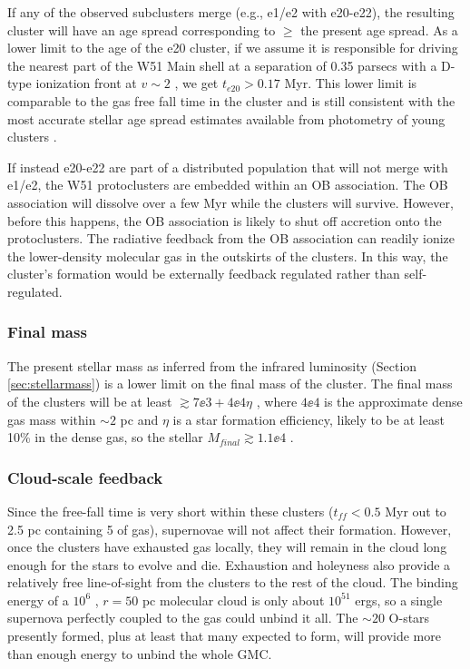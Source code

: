 If any of the observed subclusters merge (e.g., e1/e2 with e20-e22), the
resulting cluster will have an age spread corresponding to $\geq$ the present
age spread.  As a lower limit to the age of the e20 cluster, if we assume it is
responsible for driving the nearest part of the W51 Main shell at a separation
of 0.35 parsecs with a D-type ionization front at $v\sim2$ \kms, we get
$t_{e20} > 0.17$ Myr.  This lower limit is comparable to the gas free fall
time in the cluster and is still consistent with the most accurate stellar age
spread estimates available from photometry of young clusters
\citep[e.g.,][]{Kudryavtseva2012a}.

If instead e20-e22 are part of a distributed population that will not merge
with e1/e2, the W51 protoclusters are embedded within an OB association.  The
OB association will dissolve over a few Myr while the clusters will survive.
However, before this happens, the OB association is likely to shut off
accretion onto the protoclusters.  The radiative feedback from the OB
association can readily ionize the lower-density molecular gas in the outskirts
of the clusters.  In this way, the cluster's formation would be externally
feedback regulated rather than self-regulated.



\subsubsection{Final mass}
The present stellar mass as inferred from the infrared luminosity (Section
\ref{sec:stellarmass}) is a lower limit on the final mass of the cluster.  The
final mass of the clusters will be at least $\gtrsim7\ee{3} + 4\ee{4} \eta$ \msun,
where $4\ee{4}$ \msun is the approximate dense gas mass within $\sim2$ pc and
$\eta$ is a star formation efficiency, likely to be at least 10\% in the dense
gas, so the stellar $M_{final} \gtrsim 1.1\ee{4}$ \msun.

\subsubsection{Cloud-scale feedback}
Since the free-fall time is very short within these clusters ($t_{ff} < 0.5$
Myr out to 2.5 pc containing 5 \msun of gas), supernovae will not affect
their formation.  However, once the clusters have exhausted gas locally, they
will remain in the cloud long enough for the stars to evolve and die.
Exhaustion and holeyness also provide a relatively free line-of-sight from the
clusters to the rest
of the cloud.  The binding energy of a $10^6$ \msun, $r=50$ pc 
molecular cloud is only about $10^{51}$ ergs, so a single supernova perfectly
coupled to the gas could unbind it all.  The $\sim20$ O-stars presently formed,
plus at least that many expected to form, will provide more than enough energy
to unbind the whole GMC.

